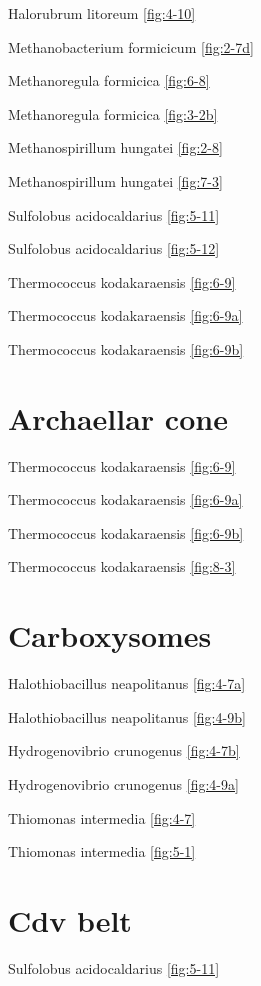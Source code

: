 \documentclass[]{tufte-book}
\begin{document}
Halorubrum litoreum \ref{fig:4-10}

Methanobacterium formicicum \ref{fig:2-7d}

Methanoregula formicica \ref{fig:6-8}

Methanoregula formicica \ref{fig:3-2b}

Methanospirillum hungatei \ref{fig:2-8}

Methanospirillum hungatei \ref{fig:7-3}

Sulfolobus acidocaldarius \ref{fig:5-11}

Sulfolobus acidocaldarius \ref{fig:5-12}

Thermococcus kodakaraensis \ref{fig:6-9}

Thermococcus kodakaraensis \ref{fig:6-9a}

Thermococcus kodakaraensis \ref{fig:6-9b}

\section{\texorpdfstring{\textbf{Archaellar
cone}}{Archaellar cone}}\label{archaellar-cone}

Thermococcus kodakaraensis \ref{fig:6-9}

Thermococcus kodakaraensis \ref{fig:6-9a}

Thermococcus kodakaraensis \ref{fig:6-9b}

Thermococcus kodakaraensis \ref{fig:8-3}

\section{\texorpdfstring{\textbf{Carboxysomes}}{Carboxysomes}}\label{carboxysomes}

Halothiobacillus neapolitanus \ref{fig:4-7a}

Halothiobacillus neapolitanus \ref{fig:4-9b}

Hydrogenovibrio crunogenus \ref{fig:4-7b}

Hydrogenovibrio crunogenus \ref{fig:4-9a}

Thiomonas intermedia \ref{fig:4-7}

Thiomonas intermedia \ref{fig:5-1}

\section{\texorpdfstring{\textbf{Cdv belt}}{Cdv belt}}\label{cdv-belt}

Sulfolobus acidocaldarius \ref{fig:5-11}
\end{document}
